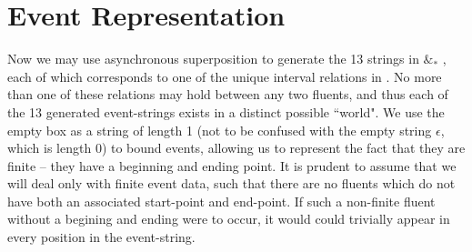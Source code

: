 \documentclass[a4paper,11pt,leqno]{article}
\newcommand{\vph}[1]{\vphantom{#1}}
\newcommand{\eboxl}[1]{\fbox{$\vph{'}#1$}}
\begin{document}
\section{Event Representation}\label{event rep}
Now we may use asynchronous superposition to generate the 13 strings in 
\eboxl{}\eboxl{e}\eboxl{} 
$\&_*$ 
\eboxl{}\eboxl{e'}\eboxl{}, each of which corresponds to one 
of the unique interval relations in \cite{allen1983maintaining}. No more than 
one of these relations may hold between any two fluents, and thus each of the 
13 generated event-strings exists in a distinct possible ``world".
We use the empty box \eboxl{} as a string of length 1 (not to be confused 
with the empty string $\epsilon$, which is length 0) to bound events, allowing 
us to represent the fact that they are finite -- they have a beginning and 
ending point. It is prudent to assume that we will deal only with finite event 
data, such that there are no fluents which do not have both an associated 
start-point and end-point. If such a non-finite fluent without a begining and 
ending were to occur, it would could trivially appear in every position in the 
event-string. 
\end{document}
